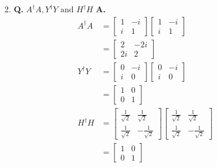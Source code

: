 \documentclass[main.tex]{subfiles}
\begin{document}
\begin{enumerate}
\begin{enumerate}
        \item[2.] \textbf{Q.} $A^{\dagger} A, Y^{\dagger} Y \text{ and } H^{\dagger} H$ \textbf{A.}
        \begin{align*}
            A^{\dagger} A   & = \left[\begin{array}{cc} 1 & -i \\ i & 1 \end{array}\right] \left[\begin{array}{cc} 1 & -i \\ i & 1 \end{array}\right]\\
                            & = \left[\begin{array}{cc} 2 & -2i \\ 2i & 2 \end{array}\right] \\
            Y^{\dagger} Y   & = \left[\begin{array}{cc} 0 & -i \\ i & 0 \end{array}\right] \left[\begin{array}{cc} 0 & -i \\ i & 0 \end{array}\right]\\
                            & = \left[\begin{array}{cc} 1 & 0 \\ 0 & 1 \end{array}\right]\\
            H^{\dagger} H   & = \left[\begin{array}{cc} \frac{1}{\sqrt{2}} & \frac{1}{\sqrt{2}} \\ \frac{1}{\sqrt{2}} & -\frac{1}{\sqrt{2}} \end{array} \right]
                                \left[\begin{array}{cc} \frac{1}{\sqrt{2}} & \frac{1}{\sqrt{2}} \\ \frac{1}{\sqrt{2}} & -\frac{1}{\sqrt{2}} \end{array} \right]\\
                            & = \left[\begin{array}{cc} 1 & 0 \\ 0 & 1 \end{array}\right]\\
        \end{align*}
        

\end{enumerate}
\end{enumerate}
\end{document}
